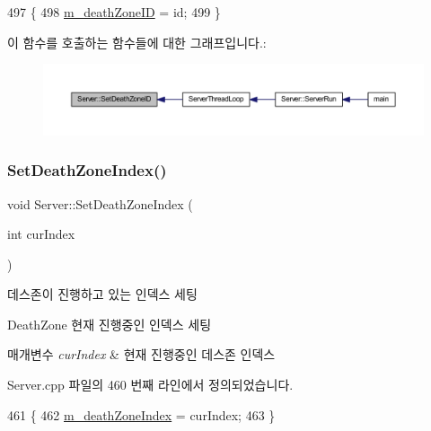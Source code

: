 \begin{DoxyCode}
497 \{
498     \hyperlink{class_server_a65e72b65d1be2dc79fddb0433402cd81}{m\_deathZoneID} = id;
499 \}
\end{DoxyCode}
이 함수를 호출하는 함수들에 대한 그래프입니다.\+:\nopagebreak
\begin{figure}[H]
\begin{center}
\leavevmode
\includegraphics[width=350pt]{class_server_a97583a37e049f390e255a61afbac02a2_icgraph}
\end{center}
\end{figure}
\mbox{\label{class_server_a9b58e281b966a1a804c89a30298285d1}} 
\subsubsection{\texorpdfstring{Set\+Death\+Zone\+Index()}{SetDeathZoneIndex()}}
{\footnotesize\ttfamily void Server\+::\+Set\+Death\+Zone\+Index (\begin{DoxyParamCaption}\item[{int}]{cur\+Index }\end{DoxyParamCaption})}



데스존이 진행하고 있는 인덱스 세팅 

Death\+Zone 현재 진행중인 인덱스 세팅


\begin{DoxyParams}{매개변수}
{\em cur\+Index} & 현재 진행중인 데스존 인덱스 \\
\hline
\end{DoxyParams}


Server.\+cpp 파일의 460 번째 라인에서 정의되었습니다.


\begin{DoxyCode}
461 \{
462     \hyperlink{class_server_a279c9f26f808acc351f9167ece2d39fb}{m\_deathZoneIndex} = curIndex;
463 \}
\end{DoxyCode}
\mbox{\label{class_server_a582ad4eb2272b1ab92daad71dc700e8d}} 
